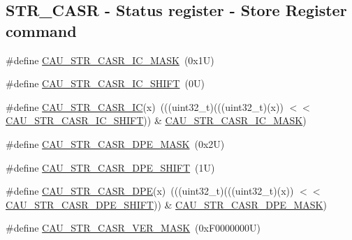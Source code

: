\subsection*{S\+T\+R\+\_\+\+C\+A\+SR -\/ Status register -\/ Store Register command}
\begin{DoxyCompactItemize}
\item 
\#define \mbox{\hyperlink{group___c_a_u___register___masks_ga8dffcd6d4b1c0445b861214d9fcb2bbd}{C\+A\+U\+\_\+\+S\+T\+R\+\_\+\+C\+A\+S\+R\+\_\+\+I\+C\+\_\+\+M\+A\+SK}}~(0x1\+U)
\item 
\#define \mbox{\hyperlink{group___c_a_u___register___masks_ga6c5490b9ee06c378d9e52f5dcc4e4da6}{C\+A\+U\+\_\+\+S\+T\+R\+\_\+\+C\+A\+S\+R\+\_\+\+I\+C\+\_\+\+S\+H\+I\+FT}}~(0\+U)
\item 
\#define \mbox{\hyperlink{group___c_a_u___register___masks_ga1c0b23bed752150ec2db949b44e8ee86}{C\+A\+U\+\_\+\+S\+T\+R\+\_\+\+C\+A\+S\+R\+\_\+\+IC}}(x)~(((uint32\+\_\+t)(((uint32\+\_\+t)(x)) $<$$<$ \mbox{\hyperlink{group___c_a_u___register___masks_ga6c5490b9ee06c378d9e52f5dcc4e4da6}{C\+A\+U\+\_\+\+S\+T\+R\+\_\+\+C\+A\+S\+R\+\_\+\+I\+C\+\_\+\+S\+H\+I\+FT}})) \& \mbox{\hyperlink{group___c_a_u___register___masks_ga8dffcd6d4b1c0445b861214d9fcb2bbd}{C\+A\+U\+\_\+\+S\+T\+R\+\_\+\+C\+A\+S\+R\+\_\+\+I\+C\+\_\+\+M\+A\+SK}})
\item 
\#define \mbox{\hyperlink{group___c_a_u___register___masks_ga44bc22302cf006a4b12f130de2f509ab}{C\+A\+U\+\_\+\+S\+T\+R\+\_\+\+C\+A\+S\+R\+\_\+\+D\+P\+E\+\_\+\+M\+A\+SK}}~(0x2\+U)
\item 
\#define \mbox{\hyperlink{group___c_a_u___register___masks_gade64f9ddd7c12103c652b284f192d6ea}{C\+A\+U\+\_\+\+S\+T\+R\+\_\+\+C\+A\+S\+R\+\_\+\+D\+P\+E\+\_\+\+S\+H\+I\+FT}}~(1\+U)
\item 
\#define \mbox{\hyperlink{group___c_a_u___register___masks_ga4ec0e28ae80a48ca4e4839148b35edcd}{C\+A\+U\+\_\+\+S\+T\+R\+\_\+\+C\+A\+S\+R\+\_\+\+D\+PE}}(x)~(((uint32\+\_\+t)(((uint32\+\_\+t)(x)) $<$$<$ \mbox{\hyperlink{group___c_a_u___register___masks_gade64f9ddd7c12103c652b284f192d6ea}{C\+A\+U\+\_\+\+S\+T\+R\+\_\+\+C\+A\+S\+R\+\_\+\+D\+P\+E\+\_\+\+S\+H\+I\+FT}})) \& \mbox{\hyperlink{group___c_a_u___register___masks_ga44bc22302cf006a4b12f130de2f509ab}{C\+A\+U\+\_\+\+S\+T\+R\+\_\+\+C\+A\+S\+R\+\_\+\+D\+P\+E\+\_\+\+M\+A\+SK}})
\item 
\#define \mbox{\hyperlink{group___c_a_u___register___masks_ga5447564cf9ebe8e0ed52d5367304d0cd}{C\+A\+U\+\_\+\+S\+T\+R\+\_\+\+C\+A\+S\+R\+\_\+\+V\+E\+R\+\_\+\+M\+A\+SK}}~(0x\+F0000000\+U)
\item 

\end{DoxyCompactItemize}
